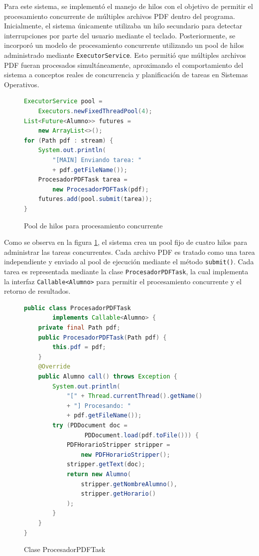 Para este sistema, se implementó el manejo de hilos con el objetivo de permitir el procesamiento concurrente de múltiples archivos PDF dentro del programa.
Inicialmente, el sistema únicamente utilizaba un hilo secundario para detectar interrupciones por parte del usuario mediante el teclado. Posteriormente, se incorporó un modelo de procesamiento concurrente utilizando un pool de hilos administrado mediante \texttt{ExecutorService}.
Esto permitió que múltiples archivos PDF fueran procesados simultáneamente, aproximando el comportamiento del sistema a conceptos reales de concurrencia y planificación de tareas en Sistemas Operativos.
\vspace{-0.5cm}
\begin{figure}[H]
    \centering
    \caption{Pool de hilos para procesamiento concurrente}
    \label{code:pool_hilos}
    \begin{lstlisting}[language=Java]
ExecutorService pool =
    Executors.newFixedThreadPool(4);
List<Future<Alumno>> futures =
    new ArrayList<>();
for (Path pdf : stream) {
    System.out.println(
        "[MAIN] Enviando tarea: "
        + pdf.getFileName());
    ProcesadorPDFTask tarea =
        new ProcesadorPDFTask(pdf);
    futures.add(pool.submit(tarea));
}
    \end{lstlisting}
\end{figure}
Como se observa en la figura \ref{code:pool_hilos}, el sistema crea un pool fijo de cuatro hilos para administrar las tareas concurrentes. Cada archivo PDF es tratado como una tarea independiente y enviado al pool de ejecución mediante el método \texttt{submit()}.
Cada tarea es representada mediante la clase \texttt{ProcesadorPDFTask}, la cual implementa la interfaz \texttt{Callable<Alumno>} para permitir el procesamiento concurrente y el retorno de resultados.
\vspace{-0.5cm}
\begin{figure}[H]
    \centering
    \caption{Clase ProcesadorPDFTask}
    \label{code:procesador_task}
    \begin{lstlisting}[language=Java]
public class ProcesadorPDFTask
        implements Callable<Alumno> {
    private final Path pdf;
    public ProcesadorPDFTask(Path pdf) {
        this.pdf = pdf;
    }
    @Override
    public Alumno call() throws Exception {
        System.out.println(
            "[" + Thread.currentThread().getName()
            + "] Procesando: "
            + pdf.getFileName());
        try (PDDocument doc =
                 PDDocument.load(pdf.toFile())) {
            PDFHorarioStripper stripper =
                new PDFHorarioStripper();
            stripper.getText(doc);
            return new Alumno(
                stripper.getNombreAlumno(),
                stripper.getHorario()
            );
        }
    }
}
    \end{lstlisting}
\end{figure}
